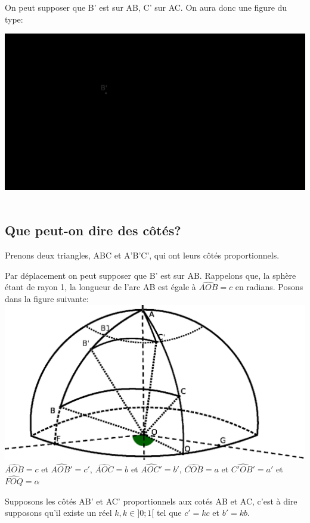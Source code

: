 \documentclass[a4paper, 12pt, twoside]{book}
\begin{document}
  
   On peut supposer que B' est sur AB, C' sur AC. On aura donc une figure du type:
  
  
  \includegraphics[scale=0.7]{figures/sphre6.eps}\
   
  
  \newpage   \subsection{Que peut-on dire des côtés?}
  
 Prenons deux triangles, ABC et A'B'C', qui ont leurs côtés proportionnels.\
 
  Par déplacement on peut supposer que B' est sur AB. Rappelons que, la sphère étant de rayon 1, la longueur de l'arc AB est égale à $\hat{AOB}=c$ en radians. Posons dans la figure suivante:\\
  
  
\includegraphics[scale=0.7]{figures/demi-sphere2bis.eps} \\
 
  $\hat{AOB}=c$ et $\hat{AOB'}=c'$,
  $\hat{AOC}=b$ et $\hat{AOC'}=b'$, 
  $\hat{COB}=a$ et $\hat{C'OB'}=a'$ et 
  $\hat{FOQ}=\alpha$ \ 
  
  Supposons les côtés AB' et AC' proportionnels aux cotés AB et AC, c'est à dire supposons qu'il existe un réel $k,k\in ]0; 1[$ tel que $c'=kc$ et $b'=kb$. \
  
\end{document}
